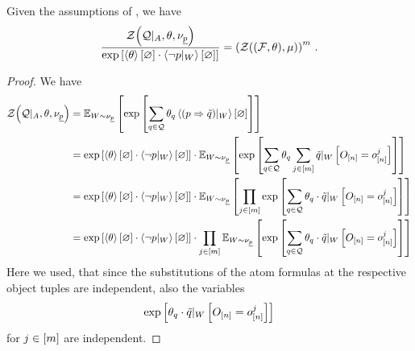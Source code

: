 \begin{lemma}\label{lem:FOLpartitionfunctionfactorization}
	Given the assumptions of , we have
	\begin{align*}
		\frac{\mathcal{Z}{\left(\mathcal{Q} |_{A},\theta , \nu_{\underline{p}}\right)}}{\mathrm{exp}\left[\left\langle \theta\right\rangle \left[ \varnothing \right] \cdot \left\langle {\lnot p}|_{W}\right\rangle \left[ \varnothing \right]\right]} = \left(\mathcal{Z}{\left((\mathcal{F},\theta),\mu\right)}\right)^m \, .
	\end{align*}
\end{lemma}
\begin{proof}
	We have
	\begin{align*}
		\mathcal{Z}{\left(\mathcal{Q} |_{A},\theta , \nu_{\underline{p}}\right)} 
		&= \mathbb{E}_{W\sim\nu_{\underline{p}}}\left[
			 \mathrm{exp}\left[\sum_{q\in\mathcal{Q}}\theta_{q}\left\langle {(p\Rightarrow\tilde{q})}|_{W}\right\rangle \left[ \varnothing \right]\right] 
		\right] \\
		&= \mathrm{exp}\left[\left\langle \theta\right\rangle \left[ \varnothing \right] \cdot \left\langle {\lnot p}|_{W}\right\rangle \left[ \varnothing \right]\right] \cdot 
		\mathbb{E}_{W\sim\nu_{\underline{p}}}\left[
			 \mathrm{exp}\left[\sum_{q\in\mathcal{Q}}\theta_{q}  \sum_{j\in[m]} {\tilde{q}}|_{W} \left[O_{[n]} = o_{[n]}^{j}\right] \right]
		\right] \\
		&= \mathrm{exp}\left[\left\langle \theta\right\rangle \left[ \varnothing \right] \cdot \left\langle {\lnot p}|_{W}\right\rangle \left[ \varnothing \right]\right] \cdot 
		\mathbb{E}_{W\sim\nu_{\underline{p}}}\left[
			\prod_{j\in[m]} \mathrm{exp}\left[ \sum_{q\in\mathcal{Q}} \theta_{q} \cdot {\tilde{q}}|_{W} \left[O_{[n]} = o_{[n]}^{j}\right] \right]
		\right] \\
		&= \mathrm{exp}\left[\left\langle \theta\right\rangle \left[ \varnothing \right] \cdot \left\langle {\lnot p}|_{W}\right\rangle \left[ \varnothing \right]\right] \cdot 
			\prod_{j\in[m]}
			 \mathbb{E}_{W\sim\nu_{\underline{p}}}\left[
			 \mathrm{exp}\left[ \sum_{q\in\mathcal{Q}} \theta_{q} \cdot {\tilde{q}}|_{W} \left[O_{[n]} = o_{[n]}^{j}\right] \right]
		\right] \\
	\end{align*}
	Here we used, that since the substitutions of the atom formulas at the respective object tuples are independent, also the variables
		\[ \mathrm{exp}\left[\theta_{q}  \cdot {\tilde{q}}|_{W} \left[O_{[n]} = o_{[n]}^{j}\right]  \right] \]
	for $j\in[m]$ are independent.
	

\end{proof}
